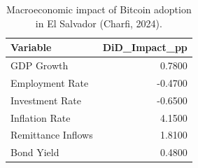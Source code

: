 \begin{table}
\caption{Macroeconomic impact of Bitcoin adoption in El Salvador (Charfi, 2024).}
\label{tab:elsalvador}
\begin{tabular}{lr}
\toprule
Variable & DiD\_Impact\_pp \\
\midrule
GDP
Growth & 0.7800 \\
Employment
Rate & -0.4700 \\
Investment
Rate & -0.6500 \\
Inflation
Rate & 4.1500 \\
Remittance
Inflows & 1.8100 \\
Bond
Yield & 0.4800 \\
\bottomrule
\end{tabular}
\end{table}
